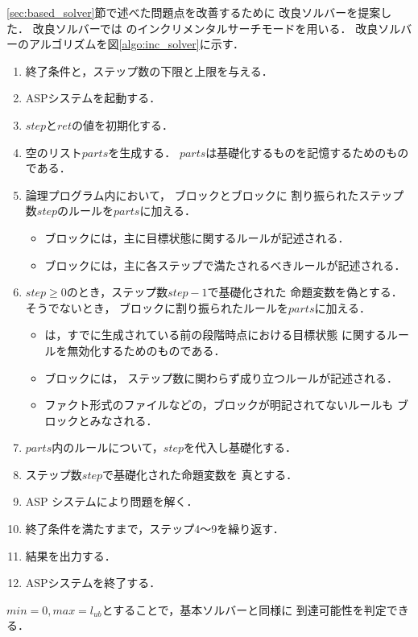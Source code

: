 \ref{sec:based_solver}節で述べた問題点を改善するために
改良ソルバーを提案した．
改良ソルバーでは \clingo のインクリメンタルサーチモードを用いる．
改良ソルバーのアルゴリズムを図\ref{algo:inc_solver}に示す．
\begin{enumerate}
  \item 終了条件と，ステップ数の下限と上限を与える．
  \item ASPシステムを起動する．
  \item $step$と$ret$の値を初期化する．
  \item 空のリスト$parts$を生成する．
  $parts$は基礎化するものを記憶するためのものである．
  \item 論理プログラム内において，
  ブロックとブロックに
  割り振られたステップ数$step$のルールを$parts$に加える．

  \begin{itemize}
    \item {}ブロックには，主に目標状態に関するルールが記述される．
    \item {}ブロックには，主に各ステップで満たされるべきルールが記述される．
  \end{itemize}

  \item $step \ge 0$のとき，ステップ数$step-1$で基礎化された
  命題変数を偽とする．そうでないとき，
  ブロックに割り振られたルールを$parts$に加える．
  \begin{itemize}
    \item {}は，すでに生成されている前の段階時点における目標状態
    に関するルールを無効化するためのものである．
  \end{itemize}

  \begin{itemize}
    \item {}ブロックには，
    ステップ数に関わらず成り立つルールが記述される．
    \item ファクト形式のファイルなどの，ブロックが明記されてないルールも
    ブロックとみなされる．
  \end{itemize}

  \item $parts$内のルールについて，$step$を代入し基礎化する．
  \item ステップ数$step$で基礎化された命題変数を
  真とする．
  \item ASP システムにより問題を解く．
  \item 終了条件を満たすまで，ステップ4～9を繰り返す．
  \item 結果を出力する．
  \item ASPシステムを終了する．
\end{enumerate}
$min = 0, max = l_{ub}$とすることで，基本ソルバーと同様に
到達可能性を判定できる．


